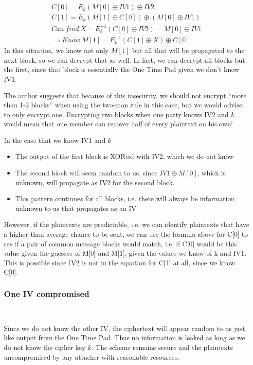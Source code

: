 \documentclass[conference]{IEEEtran}
\begin{document}
\begin{gather*}
  C[0] = E_k(M[0] \oplus IV1) \oplus IV2 \\
  C[1] = E_k(M[1] \oplus C[0]) \oplus (M[0] \oplus IV1) \\
  Can\ find\ X = E_k^{-1}(C[0] \oplus IV2) = M[0] \oplus IV1 \\
  \Rightarrow Know\ M[1] = E_k^{-1}(C[1] \oplus X) \oplus C[0]
\end{gather*}
In this situation, we know not only $M[1]$ but all that will be propagated to the next block, so we can decrypt that as well. In fact, we can decrypt all blocks but the first, since that block is essentially the One Time Pad given we don't know IV1.

The author suggests that because of this insecurity, we should not encrypt ``more than 1-2 blocks'' when using the two-man rule in this case, but we would advise to only encrypt one. Encrypting two blocks when one party knows IV2 and $k$ would mean that one member can recover half of every plaintext on his own!

In the case that we know IV1 and $k$
\begin{itemize}
 \item The output of the first block is XOR:ed with IV2, which we do not know
 \item The second block will seem random to us, since $IV1 \oplus M[0]$, which is unknown, will propagate as IV2 for the second block.
 \item This pattern continues for all blocks, i.e. there will always be information unknown to us that propagates as an IV
\end{itemize}

However, if the plaintexts are predictable, i.e. we can identify plaintexts that have a higher-than-average chance to be sent, we can use the formula above for C[0] to see if a pair of common message blocks would match, i.e. if C[0] would be this value given the guesses of M[0] and M[1], given the values we know of k and IV1. This is possible since IV2 is not in the equation for C[1] at all, since we know C[0].

\subsubsection{One IV compromised} \

Since we do not know the other IV, the ciphertext will appear random to us just like output from the One Time Pad. Thus no information is leaked as long as we do not know the cipher key $k$. The scheme remains secure and the plaintexts uncompromised by any attacker with reasonable resources.
\end{document}
